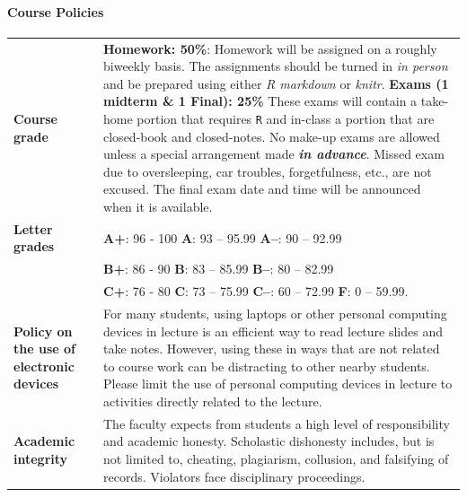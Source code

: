 \documentclass[10pt]{article}
\begin{document}
\paragraph{Course Policies}
\begin{center}
\renewcommand{\arraystretch}{1.2}
\begin{tabular}{|p{} p{}|}
\hline
\textbf{Course grade} & \textbf{Homework: 50\%}: \newline
Homework will be assigned on a roughly biweekly basis.
The assignments should be turned in \emph{in person} and be prepared using either \emph{R markdown} or \emph{knitr}.
\newline
\textbf{Exams (1 midterm \& 1 Final): 25\%}
\newline
These exams will contain a take-home portion that requires \texttt{R} and in-class a portion that are closed-book and closed-notes. 
No make-up exams are allowed unless a special arrangement made \textbf{\emph{in advance}}. 
Missed exam due to oversleeping, car troubles, forgetfulness, etc., are not excused.
The final exam date and time will be announced when it is available. \\
[.8ex]\textbf{Letter grades} & 
\textbf{A+}: 96 - 100 \hspace{.2cm} \textbf{A}: 93 -- 95.99 \hspace{.2cm} \textbf{A--}: 90 -- 92.99 \\
&\textbf{B+}: 86 - 90 \hspace{.4cm} \textbf{B}: 83 -- 85.99 \hspace{.2cm} \textbf{B--}: 80 -- 82.99 \\
& \textbf{C+}: 76 - 80 \hspace{.4cm} \textbf{C}: 73 -- 75.99 \hspace{.2cm} \textbf{C--}: 60 -- 72.99 \hspace{.2cm} \textbf{F}: 0 -- 59.99.\\
[.8ex]\textbf{Policy on the use of electronic devices} & 
For many students, using laptops or other personal computing devices in lecture is an
efficient way to read lecture slides and take notes. However, using these in ways that
are not related to course work can be distracting to other nearby students.
Please limit the use of personal computing devices in lecture to activities
directly related to the lecture. \\
[.8ex]\textbf{Academic integrity} & The faculty expects from students a high level of responsibility and academic honesty. Scholastic dishonesty includes, but is not limited to, cheating, plagiarism, collusion, and falsifying of records. Violators face disciplinary proceedings.\\

\end{tabular}
\end{center}
\end{document}
